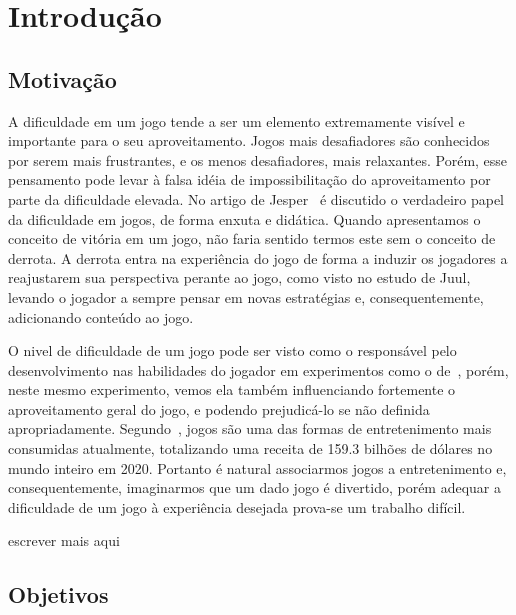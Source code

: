 
\chapter{Introdução}
\label{cap:introducao}
\section{Motivação}

A dificuldade em um jogo tende a ser um elemento extremamente visível e importante para o seu aproveitamento. Jogos mais desafiadores são conhecidos por serem mais frustrantes, e os menos desafiadores, mais relaxantes. Porém, esse pensamento pode levar à falsa idéia de impossibilitação do aproveitamento por parte da dificuldade elevada. No artigo de Jesper~\citet{FearOfFailing} é discutido o verdadeiro papel da dificuldade em jogos, de forma enxuta e didática. Quando apresentamos o conceito de vitória em um jogo, não faria sentido termos este sem o conceito de derrota. A derrota entra na experiência do jogo de forma a induzir os jogadores a reajustarem sua perspectiva perante ao jogo, como visto no estudo de Juul, levando o jogador a sempre pensar em novas estratégias e, consequentemente, adicionando conteúdo ao jogo.

O nivel de dificuldade de um jogo pode ser visto como o responsável pelo desenvolvimento nas habilidades do jogador em experimentos como o de~\citet{ExperimentalValidation}, porém, neste mesmo experimento, vemos ela também influenciando fortemente o aproveitamento geral do jogo, e podendo prejudicá-lo se não definida apropriadamente. Segundo~\citet{VideoGameBusiness}, jogos são uma das formas de entretenimento mais consumidas atualmente, totalizando uma receita de 159.3 bilhões de dólares no mundo inteiro em 2020. Portanto é natural associarmos jogos a entretenimento e, consequentemente, imaginarmos que um dado jogo é divertido, porém adequar a dificuldade de um jogo à experiência desejada prova-se um trabalho difícil.

escrever mais aqui
\textquotedbl{}

\section{Objetivos}
